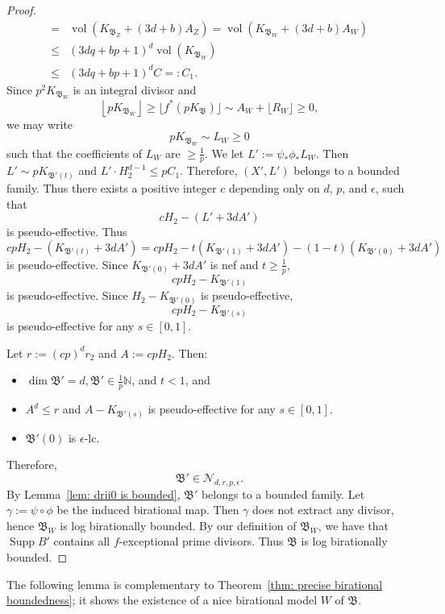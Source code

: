 \documentclass[11pt,reqno]{amsart}
\numberwithin{equation}{section}
\newcommand{\vol}{\operatorname{vol}}
\newcommand{\Supp}{\operatorname{Supp}}
\newcommand{\Bb}{{\mathfrak{B}}}
\theoremstyle{definition}
\begin{document}
\begin{proof}
\begin{align*}
    =&\vol(K_{\Bb_{Z}}+(3d+b)A_Z)=\vol(K_{\Bb_{W}}+(3d+b)A_W)\\
    \leq&(3dq+bp+1)^d\vol(K_{\Bb_W})\\
    \leq&(3dq+bp+1)^dC=:C_1.
\end{align*}
Since $p^2K_{\Bb_W}$ is an integral divisor and
$$\left\lfloor pK_{\Bb_W}\right\rfloor\geq \lfloor f^*(pK_{\Bb})\rfloor\sim A_W+\lfloor R_W\rfloor\geq 0,$$
we may write
$$pK_{\Bb_W}\sim L_W\geq 0$$
such that the coefficients of $L_W$ are $\geq\frac{1}{p}$. We let $L':=\psi_*\phi_*L_W$. Then $L'\sim pK_{\Bb'(t)}$ and $L'\cdot H_2^{d-1}\leq pC_1$. Therefore, $(X',L')$ belongs to a bounded family. Thus there exists a positive integer $c$ depending only on $d$, $p$, and $\epsilon$, such that
$$cH_2-(L'+3dA')$$
is pseudo-effective. Thus 
$$cpH_2-(K_{\Bb'(t)}+3dA')=cpH_2-t(K_{\Bb'(1)}+3dA')-(1-t)(K_{\Bb'(0)}+3dA')$$
is pseudo-effective. Since $K_{\Bb'(0)}+3dA'$ is nef and $t\geq\frac{1}{p}$,
$$cpH_2-K_{\Bb'(1)}$$
is pseudo-effective. Since $H_2-K_{\Bb'(0)}$ is pseudo-effective, 
$$cpH_2-K_{\Bb'(s)}$$
is pseudo-effective for any $s\in [0,1]$. 

Let $r:=(cp)^dr_2$ and $A:=cpH_2$. Then:
\begin{itemize}
    \item $\dim\Bb'=d,\Bb'\in\frac{1}{p}\mathbb N$, and $t<1$, and
    \item $A^d\leq r$ and $A-K_{\Bb'(s)}$ is pseudo-effective for any $s\in [0,1]$.
    \item $\Bb'(0)$ is $\epsilon$-lc.
\end{itemize}
Therefore, 
$$\Bb'\in\mathcal{N}_{d,r,p,\epsilon}.$$
By Lemma~\ref{lem: drii0 is bounded}, $\Bb'$ belongs to a bounded family.
Let $\gamma:=\psi\circ\phi$ be the induced birational map. Then $\gamma$ does not extract any divisor, hence $\Bb_W$ is log birationally bounded. By our definition of $\Bb_W$, we have that $\Supp B'$ contains all $f$-exceptional prime divisors. Thus $\Bb$ is log birationally bounded.
\end{proof}

The following lemma is complementary to Theorem~\ref{thm: precise birational boundedness}; it shows the existence of a nice birational model $W$ of $\Bb$.
\end{document}
